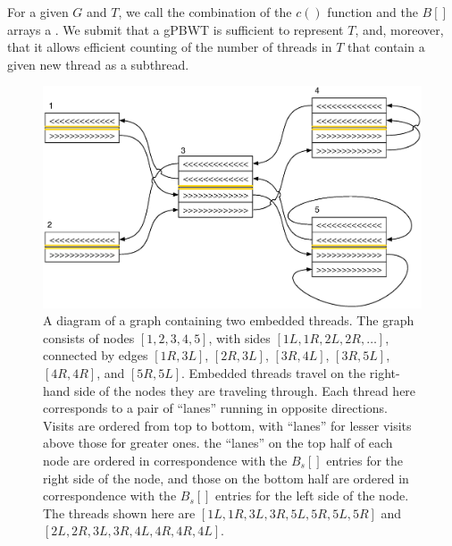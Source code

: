 For a given $G$ and $T$, we call the combination of the $c()$ function and the $B[]$ arrays a . We submit that a gPBWT is sufficient to represent $T$, and, moreover, that it allows efficient counting of the number of threads in $T$ that contain a given new thread as a subthread.

\begin{figure}[h!]
\centering
\includegraphics[width=\linewidth]{figures/03_gpbwt/highwaydiagram.eps}
\caption{A diagram of a graph containing two embedded threads. The graph consists of nodes $[1, 2, 3, 4, 5]$, with sides $[1L, 1R, 2L, 2R, \ldots]$, connected by edges $[1R, 3L]$, $[2R, 3L]$, $[3R, 4L]$, $[3R, 5L]$, $[4R, 4R]$, and $[5R, 5L]$. Embedded threads travel on the right-hand side of the nodes they are traveling through. Each thread here corresponds to a pair of ``lanes'' running in opposite directions. Visits are ordered from top to bottom, with ``lanes'' for lesser visits above those for greater ones. the ``lanes'' on the top half of each node are ordered in correspondence with the $B_s[]$ entries for the right side of the node, and those on the bottom half are ordered in correspondence with the $B_s[]$ entries for the left side of the node. The threads shown here are $[1L, 1R, 3L, 3R, 5L, 5R, 5L, 5R]$ and $[2L, 2R, 3L, 3R, 4L, 4R, 4R, 4L]$.}
\label{fig:highwaydiagram}
\end{figure}

